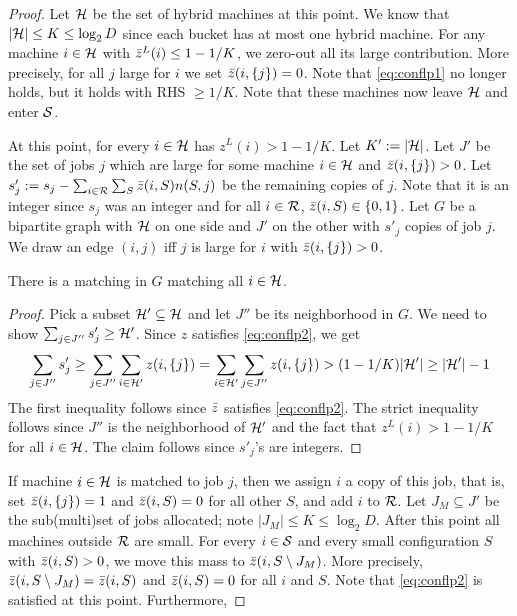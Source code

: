 \documentclass{article}[11pt]
\begin{document}
\begin{proof}
	
	Let ${\cal H}$ be the set of hybrid machines at this point. We know that $|{\cal H}| \leq K \leq \log_2 D$ since each bucket has at most one hybrid machine.
	For any machine $i\in {\cal H}$ with $\bar z^L(i) \le 1-1/K$, we zero-out all its large contribution. More precisely, for all $j$ large for $i$ we set $\bar z(i,\{j\})= 0$.
	Note that \eqref{eq:conflp1} no longer holds, but it holds with RHS $\geq 1/K$. Note that these machines now leave ${\cal H}$ and enter ${\cal S}$.
	
	At this point, for every $i\in {\cal H}$ has $z^L(i) > 1-1/K$. Let $K' := |{\cal H}|$. Let $J'$ be the set of jobs $j$ which are large for some machine $i\in {\cal H}$ and $\bar z(i,\{j\}) > 0$.
	Let $s'_j := s_j - \sum_{i\in {\cal R}} \sum_S \bar z(i,S)n(S,j)$ be the remaining copies of $j$. Note that it is an integer since $s_j$ was an integer and for all $i\in {\cal R}$, $\bar z(i,S) \in \{0,1\}$.
	Let $G$ be a bipartite graph with ${\cal H}$ on one side and $J'$ on the other with $s'_j$ copies of job $j$. We draw an edge $(i,j)$ iff $j$ is large for $i$ with $\bar z(i,\{j\}) > 0$.
	\begin{claim}
		There is a matching in $G$ matching all $i\in {\cal H}$.
	\end{claim}
	\begin{proof}
		Pick a subset ${\cal H}' \subseteq {\cal H}$ and let $J''$ be its neighborhood in $G$. We need to show $\sum_{j\in J''} s'_j \geq {\cal H}'$.
		Since $z$ satisfies \eqref{eq:conflp2}, we get
		\[
		\sum_{j\in J''} s'_j \geq \sum_{j\in J''} \sum_{i\in {\cal H}'} z(i,\{j\}) = \sum_{i\in {\cal H}'} \sum_{j\in J''} z(i,\{j\})  > (1-1/K)|{\cal H}'| \geq |{\cal H}'| - 1
		\]
		The first inequality follows since $\bar z$ satisfies \eqref{eq:conflp2}.
		The strict inequality follows since $J''$ is the neighborhood of ${\cal H}'$ and the fact that $z^L(i) > 1-1/K$ for all $i\in {\cal H}$.
		The claim follows since $s'_j$'s are integers.
	\end{proof}
	If machine $i\in {\cal H}$ is matched to job $j$, then we assign $i$ a copy of this job, that is,  set $\bar z(i,\{j\}) = 1$ and $\bar z(i,S) = 0$ for all other $S$, 
	and add $i$ to ${\cal R}$. Let $J_M \subseteq J'$ be the sub(multi)set of jobs allocated; note $|J_M| \leq K \leq \log_2 D$.
	After this point all machines outside ${\cal R}$ are small. For every $i\in {\cal S}$ and every small configuration $S$ with $\bar z(i,S) > 0$, we move this mass to $\bar z(i,S\setminus J_M)$.
	More precisely, $\bar z(i,S\setminus J_M) = \bar z(i,S)$ and $\bar z(i,S) = 0$ for all $i$ and $S$. Note that \eqref{eq:conflp2} is satisfied at this point. Furthermore,

\end{proof}
\end{document}
